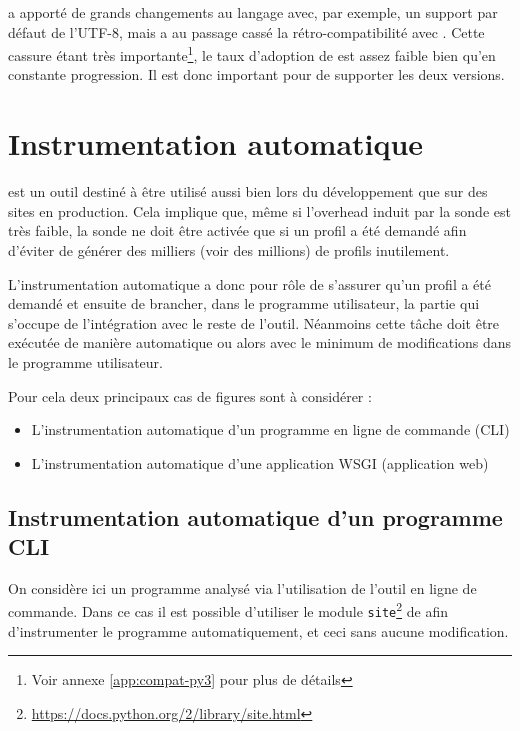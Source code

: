 \begin{note}[Python 3]
 a apporté de grands changements au langage avec, par exemple, un support par défaut de l'UTF-8, mais a au passage cassé la rétro-compatibilité avec . Cette cassure étant très importante\footnote{Voir annexe \vref{app:compat-py3} pour plus de détails}, le taux d'adoption de  est assez faible bien qu'en constante progression. Il est donc important pour \Blackfire de supporter les deux versions.
\end{note}

  \chapter[Instrumentation]{Instrumentation automatique}
\Blackfire est un outil destiné à être utilisé aussi bien lors du développement que sur des sites en production. Cela implique que, même si l'\gls{overhead} induit par la sonde est très faible, la sonde ne doit être activée que si un profil a été demandé afin d'éviter de générer des milliers (voir des millions) de profils inutilement.

L'instrumentation automatique a donc pour rôle de s'assurer qu'un profil a été demandé et ensuite de brancher, dans le \gls{programme utilisateur}, la partie qui s'occupe de l'intégration avec le reste de l'outil. Néanmoins cette tâche doit être exécutée de manière automatique ou alors avec le minimum de modifications dans le programme utilisateur.

Pour cela deux principaux cas de figures sont à considérer :
\begin{itemize}
\item L'instrumentation automatique d'un programme en ligne de commande (\gls{CLI})
\item L'instrumentation automatique d'une application \gls{WSGI} (application web)
\end{itemize}

\section[Programme CLI]{Instrumentation automatique d'un programme CLI}
\label{sec:instru-pythonpath}
On considère ici un programme analysé via l'utilisation de l'outil en ligne de commande. Dans ce cas il est possible d'utiliser le module \verb|site|\footnote{\url{https://docs.python.org/2/library/site.html}} de \Python afin d'instrumenter le programme automatiquement, et ceci sans aucune modification.

